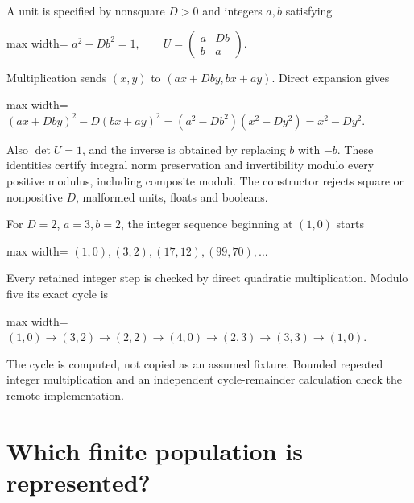 \documentclass[
  11pt,
  a4paper,
]{report}
\begin{document}
A unit is specified by nonsquare \(D>0\) and integers \(a,b\) satisfying

\begin{center}
\begin{adjustbox}{max width=\linewidth}
$\displaystyle
 a^2-Db^2=1,\qquad U=\begin{pmatrix}a&Db\\b&a\end{pmatrix}.
$
\end{adjustbox}
\end{center}

Multiplication sends \((x,y)\) to \((ax+Dby,bx+ay)\). Direct expansion
gives

\begin{center}
\begin{adjustbox}{max width=\linewidth}
$\displaystyle
 (ax+Dby)^2-D(bx+ay)^2=(a^2-Db^2)(x^2-Dy^2)=x^2-Dy^2.
$
\end{adjustbox}
\end{center}

Also \(\det U=1\), and the inverse is obtained by replacing \(b\) with
\(-b\). These identities certify integral norm preservation and
invertibility modulo every positive modulus, including composite moduli.
The constructor rejects square or nonpositive \(D\), malformed units,
floats and booleans.

For \(D=2\), \(a=3,b=2\), the integer sequence beginning at \((1,0)\)
starts

\begin{center}
\begin{adjustbox}{max width=\linewidth}
$\displaystyle
 (1,0),(3,2),(17,12),(99,70),\ldots
$
\end{adjustbox}
\end{center}

Every retained integer step is checked by direct quadratic
multiplication. Modulo five its exact cycle is

\begin{center}
\begin{adjustbox}{max width=\linewidth}
$\displaystyle
 (1,0)\to(3,2)\to(2,2)\to(4,0)\to(2,3)\to(3,3)\to(1,0).
$
\end{adjustbox}
\end{center}

The cycle is computed, not copied as an assumed fixture. Bounded
repeated integer multiplication and an independent cycle-remainder
calculation check the remote implementation.

\hypertarget{which-finite-population-is-represented}{%
\section{Which finite population is
represented?}\label{which-finite-population-is-represented}}
\end{document}

